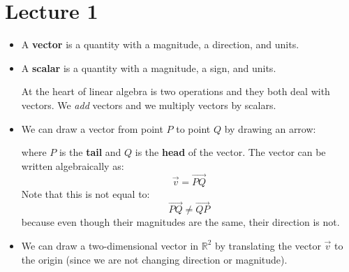 \section{Lecture 1}
\begin{itemize}
    \item A \textbf{vector} is a quantity with a magnitude, a direction, and units.
    \item A \textbf{scalar} is a quantity with a magnitude, a sign, and units.
    \begin{idea}
        At the heart of linear algebra is two operations and they both deal with vectors. We \emph{add} vectors and we multiply vectors by scalars.
    \end{idea}
    \item We can draw a vector from point $P$ to point $Q$ by drawing an arrow:
    \begin{center}
    \end{center}
    where $P$ is the \textbf{tail} and $Q$ is the \textbf{head} of the vector. The vector can be written algebraically as:
    \begin{equation}
        \vec{v}=\vec{PQ}
    \end{equation}
    Note that this is not equal to:
    \begin{equation}
        \vec{PQ} \neq \overrightarrow{QP}
        \label{eq:}
    \end{equation}
    because even though their magnitudes are the same, their direction is not.
    \item We can draw a two-dimensional vector in $\mathbb{R}^2$ by translating the vector $\vec{v}$ to the origin (since we are not changing direction or magnitude).
    \begin{center}
\end{center}
\end{itemize}
